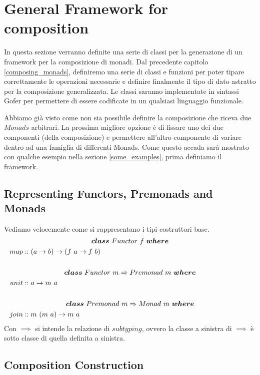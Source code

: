 \pagebreak
\section{General Framework for composition}
\label{general_framework_for_composition}

In questa sezione verranno definite una serie di classi per la generazione di
un framework per la composizione di monadi.
Dal precedente capitolo \ref{composing_monads}, definiremo una serie di classi e
funzioni per poter tipare correttamente le operazioni necessarie e definire
finalmente il tipo di dato astratto per la composizione generalizzata.
Le classi saranno implementate in sintassi Gofer per permettere di essere
codificate in un qualsiasi linguaggio funzionale.\newline

Abbiamo già visto come non sia possibile definire la composizione che riceva
due $Monads$ arbitrari.
La prossima migliore opzione è di fissare uno dei due componenti (della
composizione) e permettere all'altro componente di variare dentro ad una
famiglia di differenti Monads.
Come questo accada sarà mostrato con qualche esempio nella sezione
\ref{some_examples}, prima definiamo il framework.\newline

\subsection{Representing Functors, Premonads and Monads}
Vediamo velocemente come si rappresentano i tipi costruttori base.
\begin{align*}
  \classdef{\bm{class}\ Functor\ f\ \bm{where}}
  map &:: (a \to b) \to (f\ a \to f\ b)\\\\
  \classdef{\bm{class}\ Functor\ m \Rightarrow Premonad\ m\ \bm{where}}
  unit &:: a \to m\ a\\\\
  \classdef{\bm{class}\ Premonad\ m \Rightarrow Monad\ m\ \bm{where}}
  join &:: m\ (m\ a) \to m\ a
\end{align*}
Con $\implies$ si intende la relazione di $subtyping$, ovvero la classe a sinistra
di $\implies$ è sotto classe di quella definita a sinistra.

\subsection{Composition Construction}
\label{composition_construction}

